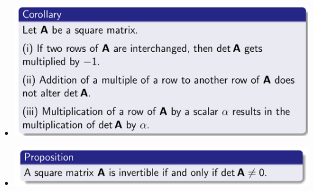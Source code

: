\documentclass{article}
\begin{document}
\begin{itemize}
  \item \includegraphics[scale = 0.4]{38.png}
  \item \includegraphics[scale = 0.4]{39.png}


\end{itemize}
\end{document}
